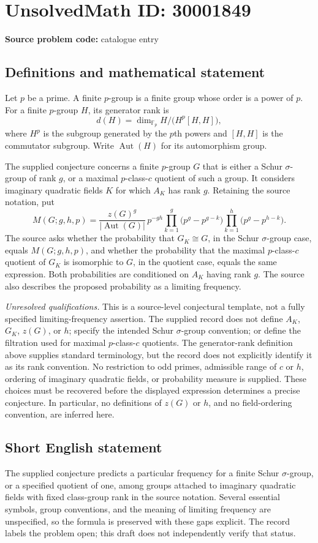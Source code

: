 \documentclass[11pt]{article}
\newcommand{\F}{\mathbb{F}}
\begin{document}
\section*{UnsolvedMath ID: 30001849}
\textbf{Source problem code:} catalogue entry
\subsection{Definitions and mathematical statement}
Let \(p\) be a prime. A finite \(p\)-group is a finite group whose order is a power of \(p\). For a finite \(p\)-group \(H\), its generator rank is
\[
d(H)=\dim_{\F_p}H/\bigl(H^p[H,H]\bigr),
\]
where \(H^p\) is the subgroup generated by the \(p\)th powers and \([H,H]\) is the commutator subgroup. Write \(\operatorname{Aut}(H)\) for its automorphism group.

The supplied conjecture concerns a finite \(p\)-group \(G\) that is either a Schur \(\sigma\)-group of rank \(g\), or a maximal \(p\)-class-\(c\) quotient of such a group. It considers imaginary quadratic fields \(K\) for which \(A_K\) has rank \(g\). Retaining the source notation, put
\[
M(G;g,h,p)=\frac{z(G)^g}{|\operatorname{Aut}(G)|}\,p^{-gh}
\prod_{k=1}^{g}\bigl(p^g-p^{g-k}\bigr)
\prod_{k=1}^{h}\bigl(p^g-p^{h-k}\bigr).
\]
The source asks whether the probability that \(G_K\cong G\), in the Schur \(\sigma\)-group case, equals \(M(G;g,h,p)\), and whether the probability that the maximal \(p\)-class-\(c\) quotient of \(G_K\) is isomorphic to \(G\), in the quotient case, equals the same expression. Both probabilities are conditioned on \(A_K\) having rank \(g\). The source also describes the proposed probability as a limiting frequency.

\emph{Unresolved qualifications.} This is a source-level conjectural template, not a fully specified limiting-frequency assertion. The supplied record does not define \(A_K\), \(G_K\), \(z(G)\), or \(h\); specify the intended Schur \(\sigma\)-group convention; or define the filtration used for maximal \(p\)-class-\(c\) quotients. The generator-rank definition above supplies standard terminology, but the record does not explicitly identify it as its rank convention. No restriction to odd primes, admissible range of \(c\) or \(h\), ordering of imaginary quadratic fields, or probability measure is supplied. These choices must be recovered before the displayed expression determines a precise conjecture. In particular, no definitions of \(z(G)\) or \(h\), and no field-ordering convention, are inferred here.
\subsection{Short English statement}
The supplied conjecture predicts a particular frequency for a finite Schur \(\sigma\)-group, or a specified quotient of one, among groups attached to imaginary quadratic fields with fixed class-group rank in the source notation. Several essential symbols, group conventions, and the meaning of limiting frequency are unspecified, so the formula is preserved with these gaps explicit. The record labels the problem open; this draft does not independently verify that status.
\end{document}
